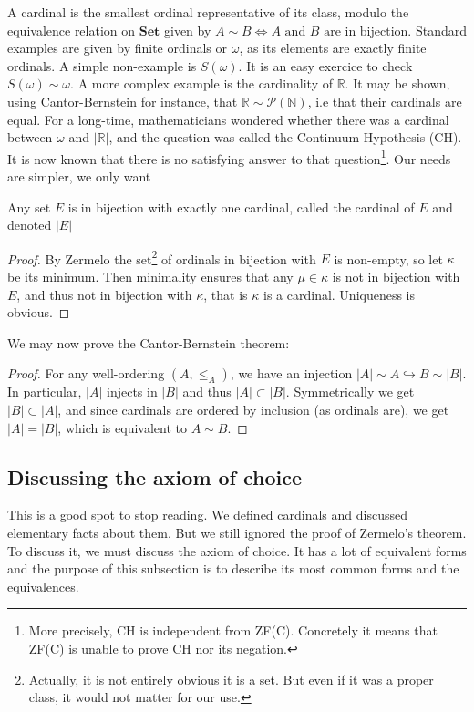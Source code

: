 \documentclass{article}
\begin{document}
A cardinal is the smallest ordinal representative of its class, modulo the equivalence relation on $\mathbf{Set}$ given by $A \sim B \iff A\text{ and } B \text{ are in bijection}$. 
Standard examples are given by finite ordinals or $\omega$, as its elements are exactly finite ordinals. A simple non-example is $S(\omega)$. It is an easy exercice to check $S(\omega) \sim \omega$. A more complex example is the cardinality of $\mathbb{R}$. It may be shown, using Cantor-Bernstein for instance, that $\mathbb{R} \sim \mathcal{P}(\mathbb{N})$, i.e that their cardinals are equal. For a long-time, mathematicians wondered whether there was a cardinal between $\omega$ and $|\mathbb{R}|$, and the question was called the Continuum Hypothesis (CH). It is now known that there is no satisfying answer to that question\footnote{More precisely, CH is independent from ZF(C). Concretely it means that ZF(C) is unable to prove CH nor its negation.}. Our needs are simpler, we only want
\begin{theorem}[ZFC]
    Any set $E$ is in bijection with exactly one cardinal, called the cardinal of $E$ and denoted $|E|$
\end{theorem}

\begin{proof}
    By Zermelo the set\footnote{Actually, it is not entirely obvious it is a set. But even if it was a proper class, it would not matter for our use.} of ordinals in bijection with $E$ is non-empty, so let $\kappa$ be its minimum. Then minimality ensures that any $\mu \in \kappa$ is not in bijection with $E$, and thus not in bijection with $\kappa$, that is $\kappa$ is a cardinal. Uniqueness is obvious.
\end{proof}

We may now prove the Cantor-Bernstein theorem: \begin{proof}
    For any well-ordering $(A, \leq_A)$, we have an injection $|A| \sim A \hookrightarrow B \sim |B|$. In particular, $|A|$ injects in $|B|$ and thus $|A| \subset |B|$. Symmetrically we get $|B| \subset |A|$, and since cardinals are ordered by inclusion (as ordinals are), we get $|A| = |B|$, which is equivalent to $A \sim B$.
\end{proof}

\subsection{Discussing the axiom of choice}
This is a good spot to stop reading. We defined cardinals and discussed elementary facts about them. But we still ignored the proof of Zermelo's theorem. To discuss it, we must discuss the axiom of choice. It has a lot of equivalent forms and the purpose of this subsection is to describe its most common forms and the equivalences.
\end{document}
